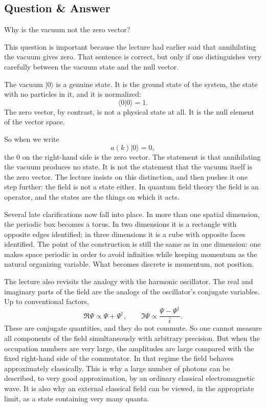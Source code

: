 \subsection{Question \& Answer}

Why is the vacuum not the zero vector?

This question is important because the lecture had earlier said that annihilating the vacuum gives zero. That sentence is correct, but only if one distinguishes very carefully between the vacuum state and the null vector.

The vacuum \(|0\rangle\) is a genuine state. It is the ground state of the system, the state with no particles in it, and it is normalized:
\begin{equation}
\langle 0|0\rangle=1.
\end{equation}
The zero vector, by contrast, is not a physical state at all. It is the null element of the vector space.

So when we write
\begin{equation}
a(k)|0\rangle=0,
\end{equation}
the \(0\) on the right-hand side is the zero vector. The statement is that annihilating the vacuum produces no state. It is not the statement that the vacuum itself is the zero vector. The lecture insists on this distinction, and then pushes it one step further: the field is not a state either. In quantum field theory the field is an operator, and the states are the things on which it acts.

Several late clarifications now fall into place. In more than one spatial dimension, the periodic box becomes a torus. In two dimensions it is a rectangle with opposite edges identified; in three dimensions it is a cube with opposite faces identified. The point of the construction is still the same as in one dimension: one makes space periodic in order to avoid infinities while keeping momentum as the natural organizing variable. What becomes discrete is momentum, not position.

The lecture also revisits the analogy with the harmonic oscillator. The real and imaginary parts of the field are the analogs of the oscillator's conjugate variables. Up to conventional factors,
\begin{equation}
\Re\Psi \propto \Psi+\Psi^\dagger,
\qquad
\Im\Psi \propto \frac{\Psi-\Psi^\dagger}{i}.
\end{equation}
These are conjugate quantities, and they do not commute. So one cannot measure all components of the field simultaneously with arbitrary precision. But when the occupation numbers are very large, the amplitudes are large compared with the fixed right-hand side of the commutator. In that regime the field behaves approximately classically. This is why a large number of photons can be described, to very good approximation, by an ordinary classical electromagnetic wave. It is also why an external classical field can be viewed, in the appropriate limit, as a state containing very many quanta.

